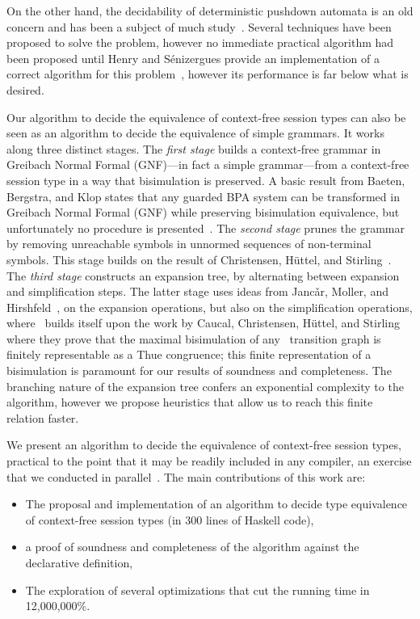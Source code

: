 On the other hand, the decidability of deterministic pushdown automata 
is an old concern and has been a subject of much 
study~\cite{janvcar2008selected,senizergues1997equivalence,stirling2001decidability}. 
Several techniques have been proposed to solve the problem, 
however no immediate practical algorithm had been proposed until
Henry and S{\'e}nizergues provide an implementation of a correct algorithm 
for this problem~\cite{henry2013lalblc}, however its performance is far below 
what is desired.


Our algorithm to decide the equivalence of context-free session types
can also be seen as an algorithm to decide the equivalence of simple 
grammars. It works along three distinct stages.
%
The \emph{first stage} builds a context-free grammar in Greibach
Normal Formal (GNF)---in fact a simple grammar---from a context-free
session type in a way that bisimulation is preserved.  A basic result
from Baeten, Bergstra, and Klop states that any guarded BPA system can
be transformed in Greibach Normal Formal (GNF) while preserving
bisimulation equivalence, but unfortunately no procedure is
presented~\cite{baeten1993decidability}.
%
The \emph{second stage} prunes the grammar by removing unreachable
symbols in unnormed sequences of non-terminal symbols. This stage
builds on the result of Christensen, H\"uttel, and Stirling~\cite{DBLP:journals/iandc/ChristensenHS95}.
%
The \emph{third stage} constructs an expansion tree, by alternating
between expansion and simplification steps. The latter stage
uses ideas from Janc\v
ar, Moller, and
Hirshfeld~\cite{hirshfeld1996bisimulation,janvcar1999techniques},
on the expansion operations, but also on the simplification
operations, where~\cite{janvcar1999techniques} builds itself
upon the work by Caucal, Christensen, H\"uttel, and 
Stirling~\cite{caucal1986decidabilite, DBLP:journals/iandc/ChristensenHS95}
where they prove that the maximal bisimulation of any \BPA\ 
transition graph is finitely representable as a Thue congruence; 
this finite representation of a bisimulation is paramount for our results 
of soundness and completeness. The branching nature 
of the expansion tree confers an exponential complexity to the algorithm, 
however we propose heuristics that allow us to reach this finite relation 
faster.

We present an algorithm to decide the equivalence of context-free
session types, practical to the point that it may be readily included
in any compiler, an exercise that we conducted in
parallel~\cite{freeST}.
%
The main contributions of this work are:
%
\begin{itemize}
\item The proposal and implementation of an algorithm to decide type
  equivalence of context-free session types (in 300 lines of Haskell
  code),
\item a proof of soundness and completeness of the algorithm against
  the declarative definition,
\item The exploration of several optimizations that cut the running
  time in 12,000,000\%.
\end{itemize}

